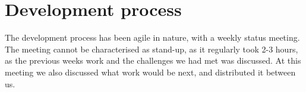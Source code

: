 \section{Development process}
The development process has been agile in nature, with a weekly status meeting. The meeting cannot be characterised as stand-up, as it regularly took 2-3 hours, as the previous weeks work and the challenges we had met was discussed. At this meeting we also discussed what work would be next, and distributed it between us.